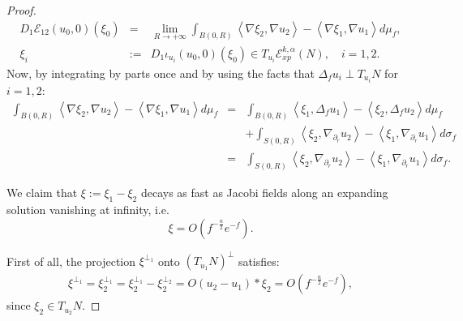 \documentclass[a4paper,11pt,reqno]{amsart}
\newcommand{\Ent}{\mathcal{E}}
\begin{document}
\begin{proof}
\begin{eqnarray*}
D_1\mathcal{E}_{12}(u_0,0)(\xi_0)&=& 
\lim_{R\rightarrow+\infty}\int_{B(0,R)}\left<\nabla \xi_2,\nabla u_2\right>-\left<\nabla \xi_1,\nabla u_1\right>d\mu_f,\\
\xi_i&:=&D_1\iota_{u_i}(u_0,0)(\xi_0)\in T_{u_i}\Ent_{xp}^{k,\alpha}(N),\quad i=1,2.
\end{eqnarray*}
Now, by integrating by parts once and by using the facts that $\Delta_fu_i\perp T_{u_i}N$ for $i=1,2$:
\begin{eqnarray*}
\int_{B(0,R)}\left<\nabla \xi_2,\nabla u_2\right>-\left<\nabla \xi_1,\nabla u_1\right>d\mu_f&=&\int_{B(0,R)}\left< \xi_1,\Delta_f u_1\right>-\left< \xi_2,\Delta_fu_2\right>d\mu_f\\
&&+\int_{S(0,R)}\left<\xi_2,\nabla_{\partial_r} u_2\right>-\left< \xi_1,\nabla_{\partial_r} u_1\right>d\sigma_f\\
&=&\int_{S(0,R)}\left<\xi_2,\nabla_{\partial_r} u_2\right>-\left< \xi_1,\nabla_{\partial_r} u_1\right>d\sigma_f.
\end{eqnarray*}

We claim that $\xi:=\xi_1-\xi_2$ decays as fast as Jacobi fields along an expanding solution vanishing at infinity, i.e.
$$\xi=\textit{O}\left(f^{-\frac{n}{2}}e^{-f}\right).$$

First of all, the projection $\xi^{\perp_1}$ onto $(T_{u_1}N)^{\perp}$ satisfies:
\begin{eqnarray}
\xi^{\perp_1}=\xi_2^{\perp_1}=\xi_2^{\perp_1}-\xi_2^{\perp_2}=\textit{O}(u_2-u_1)\ast\xi_2=\textit{O}\left(f^{-\frac{n}{2}}e^{-f}\right),\label{dec-xi-perp}
\end{eqnarray}
since $\xi_2\in T_{u_2}N$.


\end{proof}
\end{document}
